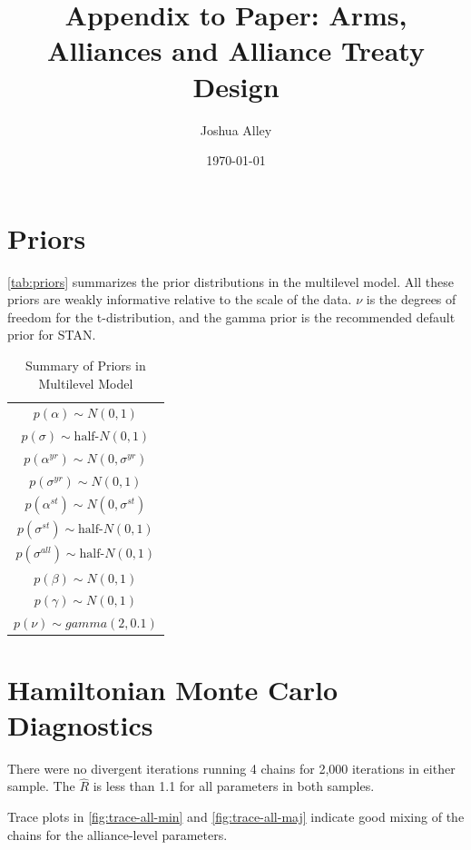 \documentclass[12pt]{article}
\title{\textbf{Appendix to Paper: Arms, Alliances and Alliance Treaty Design}}
\author{Joshua Alley}
\date{{\normalsize \today}}
\begin{document}
\maketitle 

\doublespace 



\section{Priors}

\autoref{tab:priors} summarizes the prior distributions in the multilevel model. 
All these priors are weakly informative relative to the scale of the data. 
$\nu$ is the degrees of freedom for the t-distribution, and the gamma prior is the recommended default prior for STAN. 

\begin{table} %
\begin{center}
\begin{tabular}{c} 
$ p(\alpha) \sim N(0, 1)$  \\
$ p(\sigma) \sim \mbox{half-}N(0, 1) $ \\
$ p(\alpha^{yr}) \sim N(0, \sigma^{yr}) $ \\ 
$ p(\sigma^{yr}) \sim N(0, 1) $ \\
$ p(\alpha^{st}) \sim N(0, \sigma^{st}) $ \\ 
$ p(\sigma^{st}) \sim \mbox{half-}N(0, 1) $ \\ 
$ p(\sigma^{all}) \sim \mbox{half-}N(0, 1) $ \\
$ p(\beta) \sim N(0, 1) $ \\
$ p(\gamma) \sim N(0, 1) $ \\ 
$ p(\nu) \sim gamma(2, 0.1)$ 
\end{tabular} 
\caption{Summary of Priors in Multilevel Model} 
\label{tab:priors}
\end{center} 
\end{table} 


\section{Hamiltonian Monte Carlo Diagnostics}

There were no divergent iterations running 4 chains for 2,000 iterations in either sample. The $\hat{R}$ is less than 1.1 for all parameters in both samples. 

Trace plots in \autoref{fig:trace-all-min} and \autoref{fig:trace-all-maj} indicate good mixing of the chains for the alliance-level parameters. 
\end{document}
